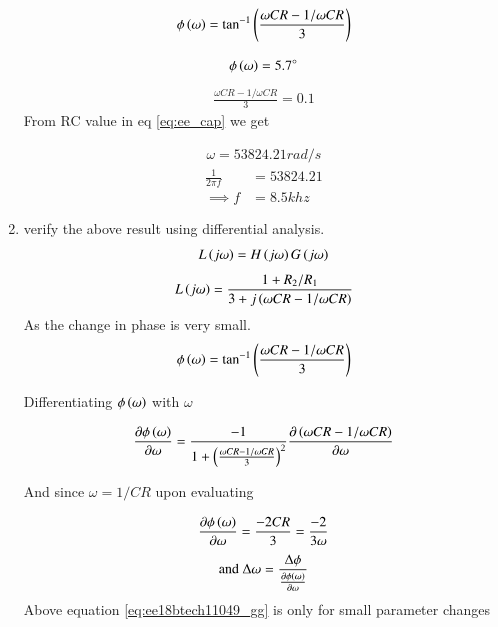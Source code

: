 \begin{enumerate}[label=\arabic*.,ref=\theenumi]
\begin{align}
\label{eq:ee18btech11049_loop_phase}
    \phi\brak{\omega} = \tan^{-1}\brak{\frac{\omega CR - 1/\omega CR}{3}}
\end{align}

\begin{align}
    \phi\left(\omega\right) = 5.7 \degree 
\end{align}
\begin{align}
    \frac{\omega CR - 1/\omega CR}{3} = 0.1
\end{align}
%
From RC value in eq \ref{eq:ee_cap} we get

\begin{align}
    \omega = 53824.21 rad/s
\end{align}
\begin{align}
    \frac{1}{2\pi f} &= 53824.21 \\
    \implies f &= 8.5 khz 
\end{align}

\item verify the above result using differential analysis.\\
\solution 
\begin{align}
    L\left(j\omega\right) = H\left(j\omega\right)G\left(j\omega\right)
\end{align}
%
\begin{align}
\label{eq:ee18btech11049_wein_main}
    L\brak{j\omega} = \frac{1+ R_2/R_1 }  {3+j\brak{\omega CR - 1/\omega CR}}
\end{align}
%
As the change in phase is very small. 
\begin{align}
    \phi\left(\omega\right) = \tan^{-1}\left(\frac{\omega CR - 1/\omega CR}{3}\right)
\end{align}

%
Differentiating $\phi\left(\omega\right) $ with $\omega$

%
\begin{align}
\label{eq:ee18btech11049_freq}
    \frac{\partial \phi\brak{\omega}}{\partial \omega}
    =\frac{-1}{1+\brak{\frac{\omega CR - 1/\omega CR}{3}}^2}
    \frac{\partial \brak{\omega CR - 1/\omega CR }}{\partial \omega}
\end{align}

%
And since $\omega = 1/CR$ upon evaluating  

%
\begin{align}
\label{eq:ee18btech11049_freq}
    \frac{\partial \phi\brak{\omega}}{\partial \omega}
   = \frac{-2CR}{3} = \frac{-2}{3\omega}
\end{align}
%
\begin{align}
\label{eq:ee18btech11049_gg}
    \text{and } \Delta\omega = \frac{\Delta\phi}{ \frac{\partial \phi\brak{\omega}}{\partial \omega}}
\end{align}
Above equation \ref{eq:ee18btech11049_gg}  is only for small parameter changes


\end{enumerate}

